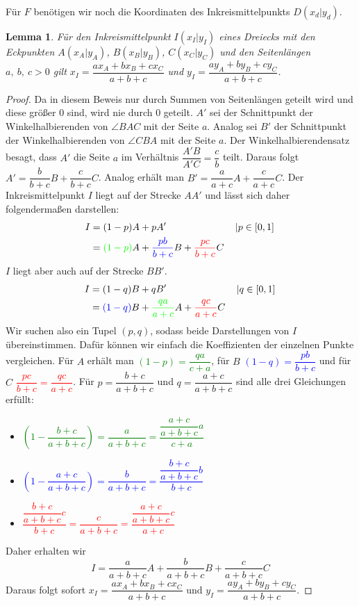 \documentclass{article}
\newtheorem{lemma}{Lemma}
\begin{document}
	Für $F$ benötigen wir noch die Koordinaten des Inkreismittelpunkts $D(x_d|y_d)$.
    \begin{lemma}
        Für den Inkreismittelpunkt $I(x_I|y_I)$ eines Dreiecks mit den Eckpunkten $A(x_A|y_A)$, $B(x_B|y_B)$, $C(x_C|y_C)$ und den Seitenlängen $a,\ b,\ c>0$ gilt $x_I = \dfrac{ax_{A}+bx_{B}+cx_{C}}{a+b+c}$ und $y_I = \dfrac {ay_{A}+by_{B}+cy_{C}}{a+b+c}$.
   \end{lemma}
   \begin{proof}
   	Da in diesem Beweis nur durch Summen von Seitenlängen geteilt wird und diese größer 0 sind, wird nie durch 0 geteilt.
   	$A'$ sei der Schnittpunkt der Winkelhalbierenden von $\angle BAC$ mit der Seite $a$.
   	Analog sei $B'$ der Schnittpunkt der Winkelhalbierenden von $\angle CBA$ mit der Seite $a$.
   	Der Winkelhalbierendensatz besagt, dass $A'$ die Seite $a$ im Verhältnis $\dfrac{A'B}{A'C}=\dfrac{c}{b}$ teilt. Daraus folgt $A'=\dfrac{b}{b+c}B+\dfrac{c}{b+c}C$.
   	Analog erhält man $B'=\dfrac{a}{a+c}A+\dfrac{c}{a+c}C$.
   	Der Inkreismittelpunkt $I$ liegt auf der Strecke $AA'$ und lässt sich daher folgendermaßen darstellen:
   	\begin{align*}
   	I&= (1-p)A+pA'&&\left|p\in [0,1]\right.\\
   	&= \textcolor{green}{(1-p)}A+\textcolor{blue}{\dfrac{pb}{b+c}}B+\textcolor{red}{\dfrac{pc}{b+c}}C
   	\end{align*}
   	$I$ liegt aber auch auf der Strecke $BB'$.
   	\begin{align*}
   	I&= (1-q)B+qB'&&\left|q\in [0,1]\right.\\
   	&= \textcolor{blue}{(1-q)}B+\textcolor{green}{\dfrac{qa}{a+c}}A+\textcolor{red}{\dfrac{qc}{a+c}}C
   	\end{align*}
   	Wir suchen also ein Tupel $(p,q)$, sodass beide Darstellungen von $I$ übereinstimmen.
   	Dafür können wir einfach die Koeffizienten der einzelnen Punkte vergleichen.
   	Für $A$ erhält man \textcolor{green}{$(1-p) = \dfrac{qa}{c+a}$}, für $B$ \textcolor{blue}{$(1-q) = \dfrac{pb}{b+c}$} und für $C$ \textcolor{red}{$\dfrac{pc}{b+c} = \dfrac{qc}{a+c}$}. Für $p = \dfrac{b+c}{a+b+c}$ und $q = \dfrac{a+c}{a+b+c}$ sind alle drei Gleichungen erfüllt:
   	\begin{itemize}
   		\item \textcolor{green}{$\left(1-\dfrac{b+c}{a+b+c}\right) = \dfrac{a}{a+b+c} = \dfrac{\dfrac{a+c}{a+b+c}a}{c+a}$}
   		\item \textcolor{blue}{$\left(1-\dfrac{a+c}{a+b+c}\right) = \dfrac{b}{a+b+c} = \dfrac{\dfrac{b+c}{a+b+c}b}{b+c}$}
   		\item \textcolor{red}{$\dfrac{\dfrac{b+c}{a+b+c}c}{b+c} = \dfrac{c}{a+b+c} = \dfrac{\dfrac{a+c}{a+b+c}c}{a+c}$}
   	\end{itemize}
   	Daher erhalten wir \[I = \dfrac{a}{a+b+c}A + \dfrac{b}{a+b+c}B+\dfrac{c}{a+b+c}C\]
   	Daraus folgt sofort $x_I = \dfrac{ax_{A}+bx_{B}+cx_{C}}{a+b+c}$ und $y_I = \dfrac {ay_{A}+by_{B}+cy_{C}}{a+b+c}$.
   \end{proof}
\end{document}
